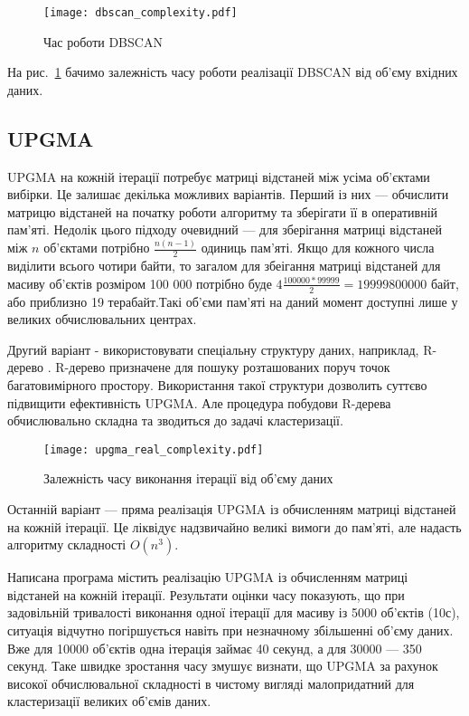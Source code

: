                 \begin{figure}
                    \centering
                    \texttt{[image: dbscan\_complexity.pdf]}
                    \caption{Час роботи DBSCAN}\label{fig:dbscan_complexity}
                \end{figure}
                
                На рис.~\ref{fig:dbscan_complexity} бачимо залежність часу роботи реалізації DBSCAN від об’єму вхідних даних.
                
            \subsection{UPGMA}
                UPGMA на кожній ітерації потребує матриці відстаней між усіма об’єктами вибірки. Це залишає декілька можливих варіантів. Перший із них --- обчислити матрицю відстаней на початку роботи алгоритму та зберігати її в оперативній пам’яті. Недолік цього підходу очевидний --- для зберігання матриці відстаней між $n$ об’єктами потрібно $\frac{n(n-1)}{2}$ одиниць пам’яті. Якщо для кожного числа виділити всього чотири байти, то загалом для збеігання матриці відстаней для масиву об’єктів розміром 100 000 потрібно буде $4\frac{100000*99999}{2} = 19999800000$ байт, або приблизно 19 терабайт.Такі об’єми пам’яті на даний момент доступні лише у великих обчислювальних центрах.
                
                Другий варіант - використовувати спеціальну структуру даних, наприклад, R-дерево \cite{Rtree}. R-дерево призначене для пошуку розташованих поруч точок багатовимірного простору. Використання такої структури дозволить суттєво підвищити ефективність UPGMA. Але процедура побудови R-дерева обчислювально складна та зводиться до задачі кластеризації.
                
                \begin{figure}
                    \centering
                    \texttt{[image: upgma\_real\_complexity.pdf]}
                    \caption{Залежність часу виконання ітерації від об’єму даних}\label{fig:upgma_real_complexity}
                \end{figure}
                
                Останній варіант --- пряма реалізація UPGMA із обчисленням матриці відстаней на кожній ітерації. Це ліквідує надзвичайно великі вимоги до пам’яті, але надасть алгоритму складності $O(n^3)$. 
                
                Написана програма містить реалізацію UPGMA із обчисленням матриці відстаней на кожній ітерації. Результати оцінки часу показують, що при задовільній тривалості виконання одної ітерації для масиву із 5000 об’єктів (10с), ситуація відчутно погіршується навіть при незначному збільшенні об’єму даних. Вже для 10000 об’єктів одна ітерація займає 40 секунд, а для 30000 --- 350 секунд. Таке швидке зростання часу змушує визнати, що UPGMA за рахунок високої обчислювальної складності в чистому вигляді малопридатний для кластеризації великих об’ємів даних.
                                
